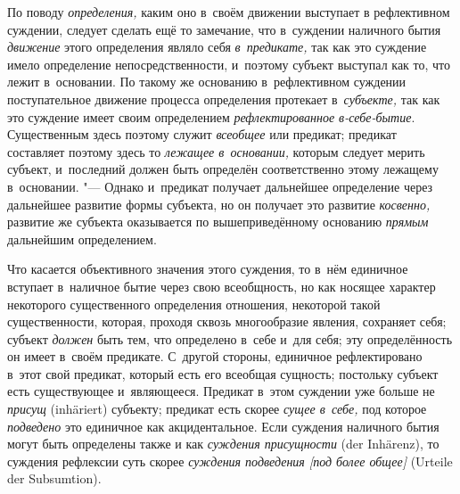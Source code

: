 По поводу {\em определения,} каким оно в~своём движении выступает в
рефлективном суждении, следует сделать ещё то замечание, что в~суждении
наличного бытия {\em движение} этого определения являло себя {\em в~предикате,}
так как это суждение имело определение непосредственности, и~поэтому субъект
выступал как то, что лежит в~основании. По такому же основанию в~рефлективном
суждении поступательное движение процесса определения протекает
в~{\em субъекте,} так как это суждение имеет своим определением
{\em рефлектированное в-себе-бытие}. Существенным здесь поэтому служит {\em
всеобщее} или предикат; предикат составляет поэтому здесь то {\em лежащее
в~основании,} которым следует мерить субъект, и~последний должен быть определён
соответственно этому лежащему в~основании. "--- Однако и~предикат получает
дальнейшее определение через дальнейшее развитие формы субъекта, но он получает
это развитие {\em косвенно,} развитие же субъекта оказывается по
вышеприведённому основанию {\em прямым} дальнейшим определением.

Что касается объективного значения этого суждения, то в~нём
единичное вступает в~наличное бытие через свою всеобщность, но как носящее
характер некоторого существенного определения отношения, некоторой такой
существенности, которая, проходя сквозь многообразие явления, сохраняет
себя; субъект {\em должен} быть тем, что определено в~себе и~для себя; эту
определённость он имеет в~своём предикате. С~другой стороны, единичное
рефлектировано в~этот свой предикат, который есть его всеобщая сущность;
постольку субъект есть существующее и~являющееся. Предикат в~этом суждении
уже больше не {\em присущ} (inhäriert) субъекту; предикат есть скорее
{\em сущее в~себе,} под которое {\em подведено} это единичное как
акцидентальное. Если суждения наличного бытия могут быть определены также
и как {\em суждения присущности} (der Inhärenz), то суждения рефлексии суть
скорее {\em суждения подведения [под более общее]} (Urteile der Subsumtion).

